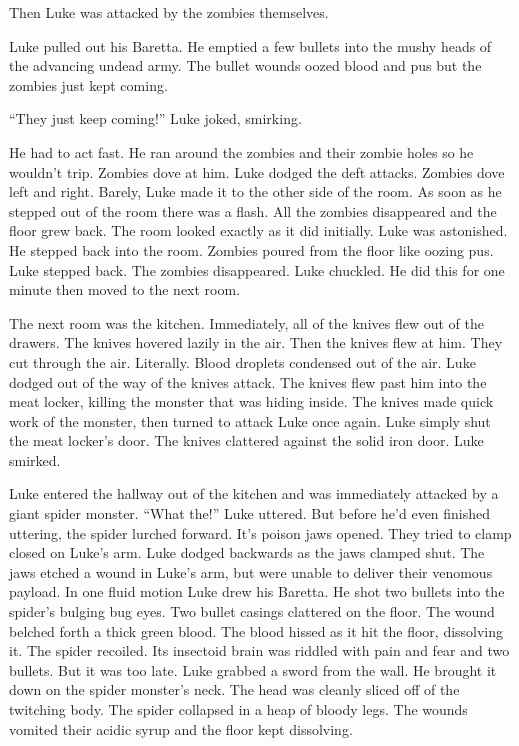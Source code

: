 Then Luke was attacked by the zombies themselves.



Luke pulled out his Baretta. He emptied a few bullets into the
mushy heads of the advancing undead army. The bullet wounds oozed
blood and pus but the zombies just kept coming.



``They just keep coming!'' Luke joked, smirking.



He had to act fast. He ran around the zombies and their zombie
holes so he wouldn't trip. Zombies dove at him. Luke dodged
the deft attacks. Zombies dove left and right. Barely, Luke made it
to the other side of the room. As soon as he stepped out of the
room there was a flash. All the zombies disappeared and the floor
grew back. The room looked exactly as it did initially. Luke was
astonished. He stepped back into the room. Zombies poured from the
floor like oozing pus. Luke stepped back. The zombies disappeared.
Luke chuckled. He did this for one minute then moved to the next
room.



The next room was the kitchen. Immediately, all of the knives flew
out of the drawers. The knives hovered lazily in the air. Then the
knives flew at him. They cut through the air. Literally. Blood
droplets condensed out of the air. Luke dodged out of the way of
the knives attack. The knives flew past him into the meat locker,
killing the monster that was hiding inside. The knives made quick
work of the monster, then turned to attack Luke once again. Luke
simply shut the meat locker's door. The knives clattered
against the solid iron door. Luke smirked.



Luke entered the hallway out of the kitchen and was immediately
attacked by a giant spider monster. ``What the!'' Luke
uttered. But before he'd even finished uttering, the spider
lurched forward. It's poison jaws opened. They tried to clamp
closed on Luke's arm. Luke dodged backwards as the jaws
clamped shut. The jaws etched a wound in Luke's arm, but were
unable to deliver their venomous payload. In one fluid motion Luke
drew his Baretta. He shot two bullets into the spider's
bulging bug eyes. Two bullet casings clattered on the floor. The
wound belched forth a thick green blood. The blood hissed as it hit
the floor, dissolving it. The spider recoiled. Its insectoid brain
was riddled with pain and fear and two bullets. But it was too
late. Luke grabbed a sword from the wall. He brought it down on the
spider monster's neck. The head was cleanly sliced off of the
twitching body. The spider collapsed in a heap of bloody legs. The
wounds vomited their acidic syrup and the floor kept
dissolving.



